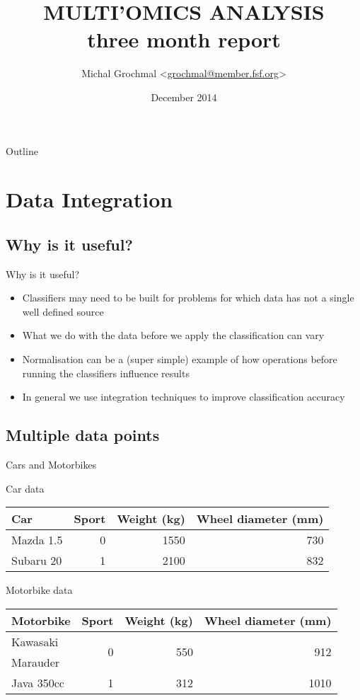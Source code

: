 \documentclass[hyperref={colorlinks=true}]{beamer}
\title{MULTI'OMICS ANALYSIS \\ three month report}
\author{Michal Grochmal
  <\href{mailto:grochmal@member.fsf.org}{grochmal@member.fsf.org}>}
\institute{Queen Mary University of London}
\date{December 2014}
\begin{document}
\begin{frame}
  \titlepage
\end{frame}

\begin{frame}{Outline}
  \tableofcontents[pausesections]
\end{frame}

\section{Data Integration}

\subsection{Why is it useful?}
\begin{frame}{Why is it useful?}
  \begin{itemize}
    \item Classifiers may need to be built for problems for which data has not
          a single well defined source
    \item What we do with the data before we apply the classification can vary
    \item Normalisation can be a (super simple) example of how operations
          before running the classifiers influence results
    \item In general we use integration techniques to improve classification
          accuracy
  \end{itemize}
\end{frame}

\subsection{Multiple data points}
\begin{frame}{Cars and Motorbikes}
  \begin{block}{Car data}
    \begin{tabular}{l|r|rr}
    Car & Sport & Weight (kg) & Wheel diameter (mm) \\
    \hline
    Mazda 1.5 & 0 & 1550 & 730 \\
    Subaru 20 & 1 & 2100 & 832 \\
    \hline
    \end{tabular}
  \end{block}
  \begin{block}{Motorbike data}
    \begin{tabular}{l|r|rr}
    Motorbike & Sport & Weight (kg) & Wheel diameter (mm) \\
    \hline
    Kawasaki   & \multirow{2}{*}{0}
               & \multirow{2}{*}{550}
               & \multirow{2}{*}{912} \\
    Marauder   & & & \\
    Java 350cc & 1 &  312 & 1010 \\
    \hline
    \end{tabular}
  \end{block}
\end{frame}
\end{document}
